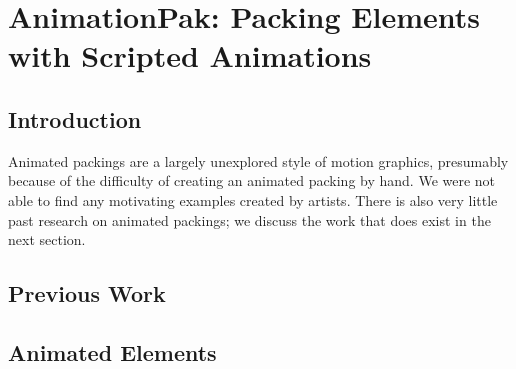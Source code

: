 \chapter{AnimationPak: Packing Elements with Scripted Animations}


\section{Introduction}
\label{animationpak_}

Animated packings are a largely unexplored style
of motion graphics, presumably because of the difficulty of creating 
an animated packing by hand.  We were not able to find any motivating
examples created by artists.  There is also very little past research
on animated packings; we discuss the work that does exist in the next
section. 

\section{Previous Work}
\label{animationpak_}


\section{Animated Elements}
\label{animationpak_}

